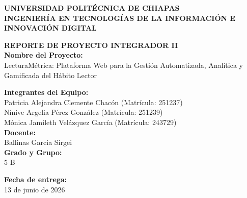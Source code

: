 \documentclass[12pt, atypical, journal]{article}
\begin{document}
\begin{titlepage}
   \begin{center}
       \vspace*{1cm}
      
       {\Large\bfseries UNIVERSIDAD POLITÉCNICA DE CHIAPAS} \\[0.5cm]
       {\large\bfseries INGENIERÍA EN TECNOLOGÍAS DE LA INFORMACIÓN E INNOVACIÓN DIGITAL} \\[1.5cm]
      
       \vfill
      
       {\Large\bfseries REPORTE DE PROYECTO INTEGRADOR II} \\[1cm]
      
       \textbf{Nombre del Proyecto:} \\
       {\large LecturaMétrica: Plataforma Web para la Gestión Automatizada, Analítica y Gamificada del Hábito Lector} \\[1.5cm]
      
       \vfill
      
       \textbf{Integrantes del Equipo:} \\[0.3cm]
       {\large Patricia Alejandra Clemente Chacón (Matrícula: 251237)} \\
       {\large Nínive Argelia Pérez González (Matrícula: 251239)} \\
       {\large Mónica Jamileth Velázquez García (Matrícula: 243729)} \\[1.5cm]
      
       \textbf{Docente:} \\
       {\large Ballinas Garcia Sirgei} \\[1.5cm]
       
       \textbf{Grado y Grupo:} \\
       {\large 5 B} \\[1.5cm]
      
       \vfill
      
       \textbf{Fecha de entrega:} \\
       {\large 13 de junio de 2026}
      
       \vspace*{1cm}
   \end{center}
\end{titlepage}

\newpage
\end{document}
